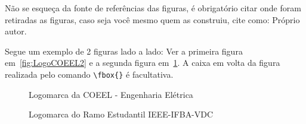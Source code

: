 \vspace{2mm}

Não se esqueça da fonte de referências das figuras, é obrigatório citar onde foram retiradas as figuras, caso seja você mesmo quem as construiu, cite como: Próprio autor.

Segue um exemplo de 2 figuras lado a lado: Ver a primeira figura em~\ref{fig:LogoCOEEL2} e a segunda figura em~\ref{fig:LogoIEEE}.
A caixa em volta da figura realizada pelo comando \verb|\fbox{}| é facultativa.

\begin{figure}[htb] 
    \begin{minipage}[b]{0.44 \linewidth}
            \caption{Logomarca da COEEL - Engenharia Elétrica}
            \label{fig:LogoCOEEL2}
    \end{minipage}
    \hfill
    \begin{minipage}[b]{0.44 \linewidth}
        \caption{Logomarca do Ramo Estudantil IEEE-IFBA-VDC}
        \label{fig:LogoIEEE}         
    \end{minipage} 
\end{figure}


